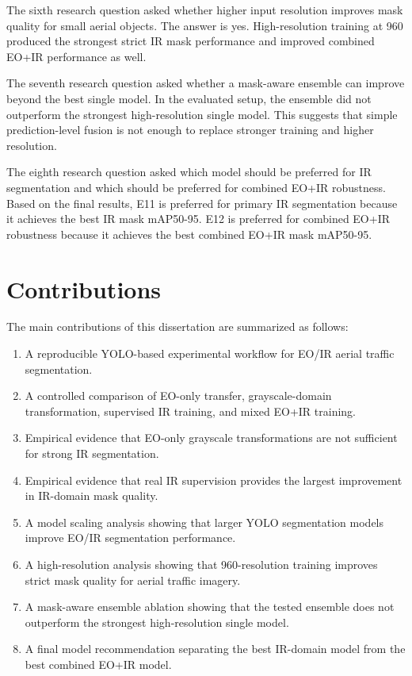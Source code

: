 The sixth research question asked whether higher input resolution improves mask quality for small aerial objects. The answer is yes. High-resolution training at 960 produced the strongest strict IR mask performance and improved combined EO+IR performance as well.

The seventh research question asked whether a mask-aware ensemble can improve beyond the best single model. In the evaluated setup, the ensemble did not outperform the strongest high-resolution single model. This suggests that simple prediction-level fusion is not enough to replace stronger training and higher resolution.

The eighth research question asked which model should be preferred for IR segmentation and which should be preferred for combined EO+IR robustness. Based on the final results, E11 is preferred for primary IR segmentation because it achieves the best IR mask mAP50-95. E12 is preferred for combined EO+IR robustness because it achieves the best combined EO+IR mask mAP50-95.

\section{Contributions}

The main contributions of this dissertation are summarized as follows:

\begin{enumerate}
    \item A reproducible YOLO-based experimental workflow for EO/IR aerial traffic segmentation.
    \item A controlled comparison of EO-only transfer, grayscale-domain transformation, supervised IR training, and mixed EO+IR training.
    \item Empirical evidence that EO-only grayscale transformations are not sufficient for strong IR segmentation.
    \item Empirical evidence that real IR supervision provides the largest improvement in IR-domain mask quality.
    \item A model scaling analysis showing that larger YOLO segmentation models improve EO/IR segmentation performance.
    \item A high-resolution analysis showing that 960-resolution training improves strict mask quality for aerial traffic imagery.
    \item A mask-aware ensemble ablation showing that the tested ensemble does not outperform the strongest high-resolution single model.
    \item A final model recommendation separating the best IR-domain model from the best combined EO+IR model.
\end{enumerate}

